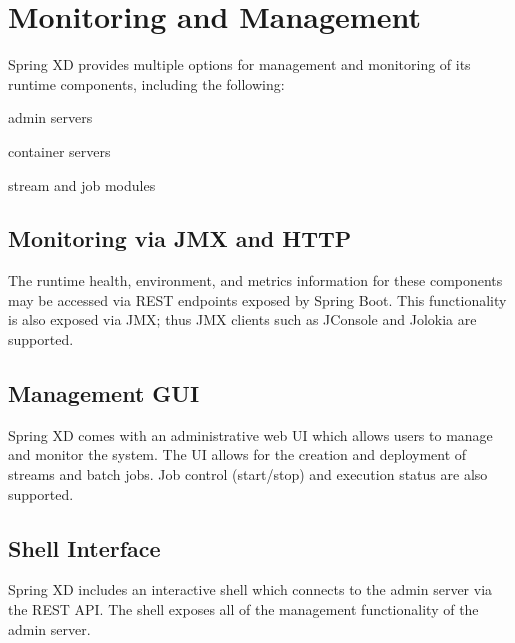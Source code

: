 \section {Monitoring and Management}
Spring XD provides multiple options for management and monitoring of
its runtime components, including the following:\begin{itemize*}
	\item admin servers
	\item container servers
	\item stream and job modules
\end{itemize*}

\subsection {Monitoring via JMX and HTTP}
The runtime health, environment, and metrics information for these components
may be accessed via REST endpoints exposed by Spring Boot\cite{spring-boot}.
This functionality is also exposed via JMX; thus JMX clients such as JConsole
and Jolokia are supported.

\subsection {Management GUI}
Spring XD comes with an administrative web UI which allows users to manage
and monitor the system. The UI allows for the creation and deployment
of streams and batch jobs. Job control (start/stop) and execution status
are also supported.

\subsection {Shell Interface}
Spring XD includes an interactive shell which connects to the admin server
via the REST API. The shell exposes all of the management functionality
of the admin server.


